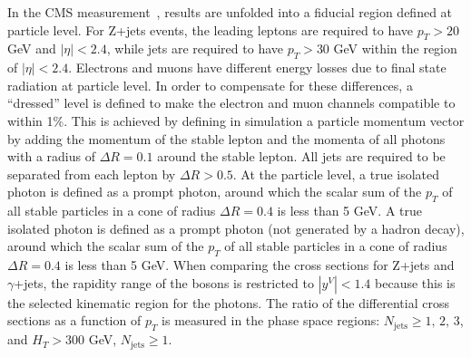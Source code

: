 \documentclass[11pt]{cernrep} \usepackage{graphicx,epsfig} 
\begin{document}
In the CMS measurement~\cite{Khachatryan:2015ira}, results are unfolded into a fiducial region defined at particle
level. For Z+jets events, the leading leptons are required to have $p_T>20$ GeV and $|\eta|<2.4$, 
while jets are required to have $p_T>30$ GeV within the region of $|\eta|<2.4$. Electrons and muons have different
energy losses due to final state radiation at particle level. In order to compensate for these differences, a
``dressed'' level is defined to make the electron and muon channels compatible to within 1\%. This is achieved by
defining in simulation a particle momentum vector by adding the momentum of the stable lepton and the momenta of all
photons with a radius of $\Delta R=0.1$ around the stable lepton. All jets are required to be separated from each lepton
by $\Delta R>0.5$. At the particle level, a true isolated photon is defined as a prompt photon, around which the scalar
sum of the $p_T$ of all stable particles in a cone of radius $\Delta R=0.4$ is less than 5 GeV. A true isolated photon
is defined as a prompt photon (not generated by a hadron decay), around which the scalar sum 
of the $p_T$ of all stable particles in a cone of radius $\Delta R=0.4$ is less than 5 GeV. When comparing the
cross sections for Z+jets and $\gamma$+jets, the rapidity range of the bosons
is restricted to $|{y^{V}}|<1.4$ because this is the selected kinematic region for the photons.
The ratio of the differential cross sections as a function of $p_T$ is measured
in the phase space regions: $N_{\mathrm{jets}}\geq 1,\,2,\,3$, and $H_T>300$ GeV, $N_{\mathrm{jets}}\geq1$. 
\end{document}
